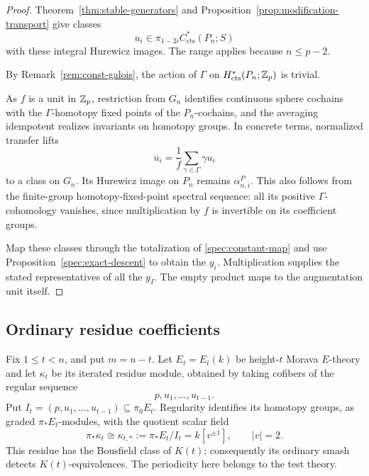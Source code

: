\begin{proof}
Theorem~\ref{thm:stable-generators} and
Proposition~\ref{prop:modification-transport} give classes
\[
u_i\in\pi_{1-2i}C^*_{\mathrm{cts}}(P_n;S)
\]
with these integral Hurewicz images. The range applies because
\(n\leq p-2\).

By Remark~\ref{rem:const-galois}, the action of $\Gamma$ on
$H^*_{\mathrm{cts}}(P_n;\mathbb Z_p)$ is trivial.

As \(f\) is a unit in \(\mathbb Z_p\), restriction from \(G_n\) identifies
continuous sphere cochains with the \(\Gamma\)-homotopy fixed
points of the \(P_n\)-cochains, and the averaging idempotent realizes
invariants on homotopy groups. In concrete terms, normalized transfer
lifts
\[
\overline u_i=\frac1f\sum_{\gamma\in\Gamma}\gamma u_i
\]
to a class on \(G_n\). Its Hurewicz image on \(P_n\) remains
\(\alpha^P_{n,i}\). This also follows from the finite-group
homotopy-fixed-point spectral sequence: all its positive
\(\Gamma\)-cohomology vanishes, since multiplication by \(f\) is
invertible on its coefficient groups.

Map these classes through the totalization of
\eqref{spec:constant-map} and use
Proposition~\ref{spec:exact-descent} to obtain the \(y_i\).
Multiplication supplies the stated representatives of all the
\(y_I\). The empty product maps to the augmentation unit itself.
\end{proof}

\subsection{Ordinary residue coefficients}

Fix \(1\leq t<n\), and put \(m=n-t\). Let \(E_t=E_t(k)\) be
height-\(t\) Morava \(E\)-theory and let \(\kappa_t\) be its
iterated residue module, obtained by taking cofibers of the regular
sequence
\[
p,u_1,\ldots,u_{t-1}.
\]
Put \(I_t=(p,u_1,\ldots,u_{t-1})\subseteq\pi_0E_t\).
Regularity identifies its homotopy groups, as graded
\(\pi_*E_t\)-modules, with the quotient scalar field
\[
\pi_*\kappa_t\cong\kappa_{t,*}:=\pi_*E_t/I_t
=k[v^{\pm1}],\qquad |v|=2.
\]
This residue has the Bousfield class of \(K(t)\); consequently its
ordinary smash detects \(K(t)\)-equivalences. The periodicity here
belongs to the test theory.

